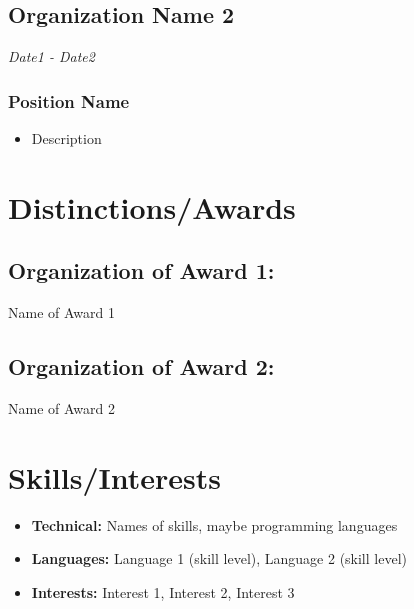 \documentclass{article}
\renewcommand{\date}[1]{
    \hfill{\normalsize\textit{#1}}
}
\newcommand{\awardname}[1]{
    \hspace{0em}
    {#1}
}
\begin{document}
        \subsection{Organization Name 2}\date{Date1 - Date2}
            \subsubsection{Position Name}
                \begin{itemize}
                    \item Description
                \end{itemize}
    \section{Distinctions/Awards}

        \subsection{Organization of Award 1:}
            \awardname{Name of Award 1}
        \subsection{Organization of Award 2:}
            \awardname{Name of Award 2}
    \section{Skills/Interests}
        \begin{itemize}
            \item {\bfseries Technical:} Names of skills, maybe programming languages
            \item {\bfseries Languages:} Language 1 (skill level), Language 2 (skill level)
            \item {\bfseries Interests:} Interest 1, Interest 2, Interest 3
        \end{itemize}
\end{document}
